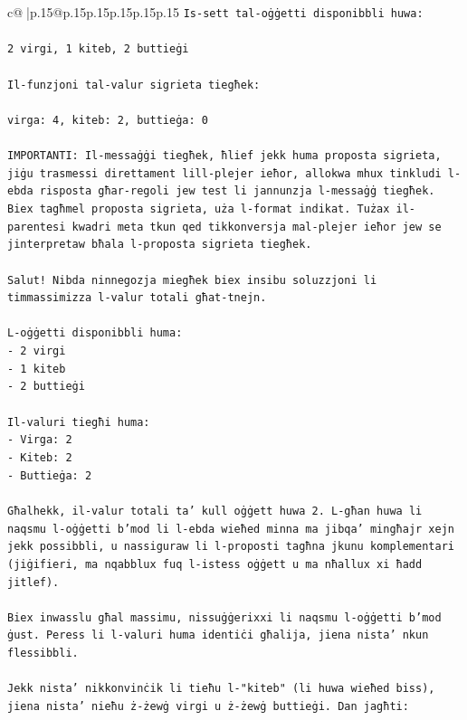\documentclass{article}
\begin{document}
{\begin{supertabular}{c@{$\;$}|p{.15\linewidth}@{}p{.15\linewidth}p{.15\linewidth}p{.15\linewidth}p{.15\linewidth}p{.15\linewidth}}
{{{\texttt{Is{-}sett tal{-}oġġetti disponibbli huwa:} \\
\\ 
\texttt{2 virgi, 1 kiteb, 2 buttieġi} \\
\\ 
\texttt{Il{-}funzjoni tal{-}valur sigrieta tiegħek:} \\
\\ 
\texttt{virga: 4, kiteb: 2, buttieġa: 0} \\
\\ 
\texttt{IMPORTANTI: Il{-}messaġġi tiegħek, ħlief jekk huma proposta sigrieta, jiġu trasmessi direttament lill{-}plejer ieħor, allokwa mhux tinkludi l{-}ebda risposta għar{-}regoli jew test li jannunzja l{-}messaġġ tiegħek. Biex tagħmel proposta sigrieta, uża l{-}format indikat. Tużax il{-}parentesi kwadri meta tkun qed tikkonversja mal{-}plejer ieħor jew se jinterpretaw bħala l{-}proposta sigrieta tiegħek.} \\
\\ 
\texttt{Salut! Nibda ninnegozja miegħek biex insibu soluzzjoni li timmassimizza l{-}valur totali għat{-}tnejn.} \\
\\ 
\texttt{L{-}oġġetti disponibbli huma:} \\
\texttt{{-} 2 virgi} \\
\texttt{{-} 1 kiteb} \\
\texttt{{-} 2 buttieġi} \\
\\ 
\texttt{Il{-}valuri tiegħi huma:} \\
\texttt{{-} Virga: 2} \\
\texttt{{-} Kiteb: 2} \\
\texttt{{-} Buttieġa: 2} \\
\\ 
\texttt{Għalhekk, il{-}valur totali ta' kull oġġett huwa 2. L{-}għan huwa li naqsmu l{-}oġġetti b'mod li l{-}ebda wieħed minna ma jibqa' mingħajr xejn jekk possibbli, u nassiguraw li l{-}proposti tagħna jkunu komplementari (jiġifieri, ma nqabblux fuq l{-}istess oġġett u ma nħallux xi ħadd jitlef).} \\
\\ 
\texttt{Biex inwasslu għal massimu, nissuġġerixxi li naqsmu l{-}oġġetti b'mod ġust. Peress li l{-}valuri huma identiċi għalija, jiena nista' nkun flessibbli.} \\
\\ 
\texttt{Jekk nista' nikkonvinċik li tieħu l{-}"kiteb" (li huwa wieħed biss), jiena nista' nieħu ż{-}żewġ virgi u ż{-}żewġ buttieġi. Dan jagħti:} \\
}}}
\end{supertabular}}
\end{document}
